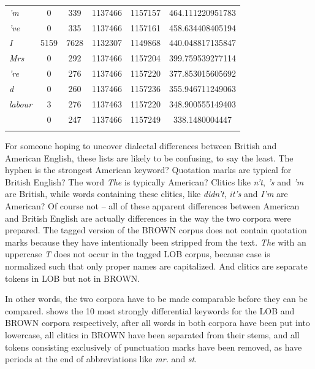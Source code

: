 \begin{table}
{\begin{tabular}[t]{l *{2}{S[table-format=4]} *{2}{S[table-format=8]} S}
\textit{'m} & 0 & 339 & 1137466 & 1157157 & 464.111220951783 \\
\textit{'ve} & 0 & 335 & 1137466 & 1157161 & 458.634408405194 \\
\textit{I} & 5159 & 7628 & 1132307 & 1149868 & 440.048817135847 \\
\textit{Mrs} & 0 & 292 & 1137466 & 1157204 & 399.759539277114 \\
\textit{'re} & 0 & 276 & 1137466 & 1157220 & 377.853015605692 \\
\textit{d} & 0 & 260 & 1137466 & 1157236 & 355.946711249063 \\
\textit{labour} & 3 & 276 & 1137463 & 1157220 & 348.900555149403 \\
\textit{~} & 0 & 247 & 1137466 & 1157249 & 338.1480004447 \\
\lspbottomrule
\end{tabular}}
\end{table}

For someone hoping to uncover dialectal differences between British  and American  English, these lists are likely to be confusing, to say the least. The hyphen is the strongest American keyword?  Quotation marks are typical for British English? The word \textit{The} is typically American? Clitics  like \textit{n't}, \textit{'s} and \textit{'m} are British, while words containing these clitics,  like \textit{didn't}, \textit{it's} and \textit{I'm} are American? Of course not -- all of these apparent differences between American  and British English are actually differences in the way the two corpora were prepared. The tagged version of the BROWN  corpus does not contain quotation marks because they have intentionally been stripped from the text. \textit{The} with an uppercase \textit{T} does not occur in the tagged LOB  corpus, because case is normalized such that only proper names are capitalized. And clitics  are separate tokens  in LOB but not in  BROWN.

In other words, the two corpora have to be made comparable before they can be compared.  shows the 10 most strongly differential keywords  for the LOB  and BROWN  corpora respectively, after all words in both corpora have been put into lowercase, all clitics  in BROWN  have been separated from their stems,  and all tokens  consisting exclusively of punctuation marks have been removed, as have periods at the end of abbreviations like \textit{mr.} and \textit{st}.

